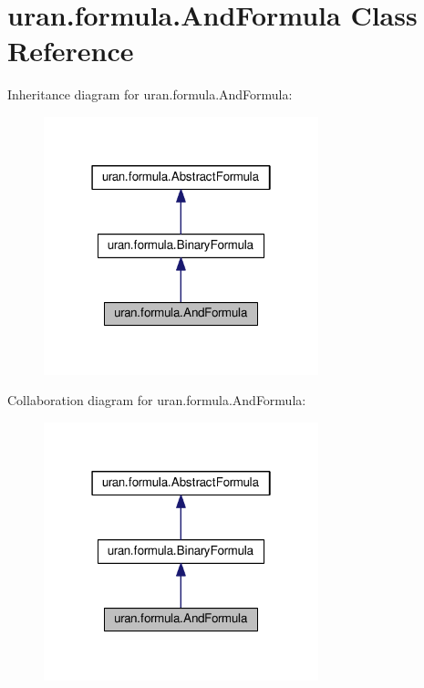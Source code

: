 \hypertarget{classuran_1_1formula_1_1_and_formula}{}\section{uran.\+formula.\+And\+Formula Class Reference}
\label{classuran_1_1formula_1_1_and_formula}


Inheritance diagram for uran.\+formula.\+And\+Formula\+:
\nopagebreak
\begin{figure}[H]
\begin{center}
\leavevmode
\includegraphics[width=226pt]{classuran_1_1formula_1_1_and_formula__inherit__graph}
\end{center}
\end{figure}


Collaboration diagram for uran.\+formula.\+And\+Formula\+:
\nopagebreak
\begin{figure}[H]
\begin{center}
\leavevmode
\includegraphics[width=226pt]{classuran_1_1formula_1_1_and_formula__coll__graph}
\end{center}
\end{figure}
